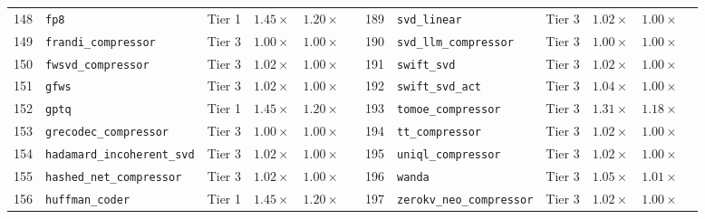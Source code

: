 \begin{table}[t]
{\begin{tabular}{r l c c c l | r l c c c l}
148 & \texttt{fp8} & Tier 1 & $1.45\times$ & $1.20\times$ & \passfast{} & 189 & \texttt{svd\_linear} & Tier 3 & $1.02\times$ & $1.00\times$ & \passslow{} \\
149 & \texttt{frandi\_compressor} & Tier 3 & $1.00\times$ & $1.00\times$ & \passslow{} & 190 & \texttt{svd\_llm\_compressor} & Tier 3 & $1.00\times$ & $1.00\times$ & \passslow{} \\
150 & \texttt{fwsvd\_compressor} & Tier 3 & $1.02\times$ & $1.00\times$ & \passslow{} & 191 & \texttt{swift\_svd} & Tier 3 & $1.02\times$ & $1.00\times$ & \passslow{} \\
151 & \texttt{gfws} & Tier 3 & $1.02\times$ & $1.00\times$ & \passslow{} & 192 & \texttt{swift\_svd\_act} & Tier 3 & $1.04\times$ & $1.00\times$ & \passfast{} \\
152 & \texttt{gptq} & Tier 1 & $1.45\times$ & $1.20\times$ & \passfast{} & 193 & \texttt{tomoe\_compressor} & Tier 3 & $1.31\times$ & $1.18\times$ & \passfast{} \\
153 & \texttt{grecodec\_compressor} & Tier 3 & $1.00\times$ & $1.00\times$ & \passslow{} & 194 & \texttt{tt\_compressor} & Tier 3 & $1.02\times$ & $1.00\times$ & \passslow{} \\
154 & \texttt{hadamard\_incoherent\_svd} & Tier 3 & $1.02\times$ & $1.00\times$ & \passslow{} & 195 & \texttt{uniql\_compressor} & Tier 3 & $1.02\times$ & $1.00\times$ & \passslow{} \\
155 & \texttt{hashed\_net\_compressor} & Tier 3 & $1.02\times$ & $1.00\times$ & \passslow{} & 196 & \texttt{wanda} & Tier 3 & $1.05\times$ & $1.01\times$ & \passfast{} \\
156 & \texttt{huffman\_coder} & Tier 1 & $1.45\times$ & $1.20\times$ & \passfast{} & 197 & \texttt{zerokv\_neo\_compressor} & Tier 3 & $1.02\times$ & $1.00\times$ & \passslow{} \\
\bottomrule
\end{tabular}%
}
\end{table}

